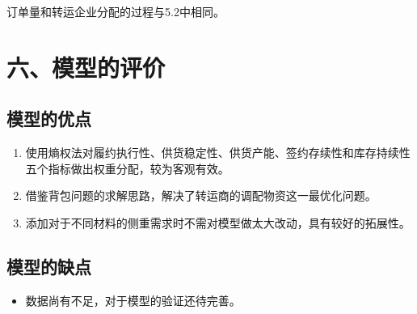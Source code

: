 \documentclass{my_paper}
\begin{document}
订单量和转运企业分配的过程与5.2中相同。


\section{六、模型的评价}

\subsection{模型的优点}
\begin{enumerate}
    \item 使用熵权法对履约执行性、供货稳定性、供货产能、签约存续性和库存持续性五个指标做出权重分配，较为客观有效。
    \item 借鉴背包问题的求解思路，解决了转运商的调配物资这一最优化问题。
    \item 添加对于不同材料的侧重需求时不需对模型做太大改动，具有较好的拓展性。
\end{enumerate}

\subsection{模型的缺点}
\begin{itemize}
    \item 数据尚有不足，对于模型的验证还待完善。
\end{itemize}

\newpage
\begin{center}
\end{center}

\newpage
\end{document}
